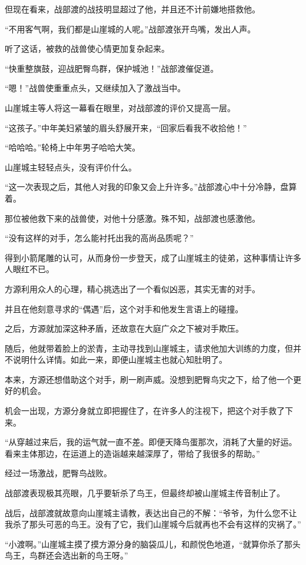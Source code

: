 \begin{this_body}
但现在看来，战部渡的战技明显超过了他，并且还不计前嫌地搭救他。

“不用客气啊，我们都是山崖城的人呢。”战部渡张开鸟嘴，发出人声。

听了这话，被救的战兽使心情更加复杂起来。

“快重整旗鼓，迎战肥臀鸟群，保护城池！”战部渡催促道。

“嗯！”战兽使重重点头，又继续加入了激战当中。

山崖城主等人将这一幕看在眼里，对战部渡的评价又提高一层。

“这孩子。”中年美妇紧皱的眉头舒展开来，“回家后看我不收拾他！”

“哈哈哈。”轮椅上中年男子哈哈大笑。

山崖城主轻轻点头，没有评价什么。

“这一次表现之后，其他人对我的印象又会上升许多。”战部渡心中十分冷静，盘算着。

那位被他救下来的战兽使，对他十分感激。殊不知，战部渡也感激他。

“没有这样的对手，怎么能衬托出我的高尚品质呢？”

得到小箭尾雕的认可，从而身份一步登天，成了山崖城主的徒弟，这种事情让许多人眼红不已。

方源利用众人的心理，精心挑选出了一个看似凶恶，其实无害的对手。

并且在他刻意寻求的“偶遇”后，这个对手和他发生言语上的碰撞。

之后，方源就加深这种矛盾，还故意在大庭广众之下被对手欺压。

随后，他就带着脸上的淤青，主动寻找到山崖城主，请求他加大训练的力度，但并不说明什么详情。如此一来，即便山崖城主也就心知肚明了。

本来，方源还想借助这个对手，刷一刷声威。没想到肥臀鸟灾之下，给了他一个更好的机会。

机会一出现，方源分身就立即把握住了，在许多人的注视下，把这个对手救了下来。

“从穿越过来后，我的运气就一直不差。即便天降鸟蛋那次，消耗了大量的好运。看来主体那边，在运道上的造诣越来越深厚了，带给了我很多的帮助。”

经过一场激战，肥臀鸟战败。

战部渡表现极其亮眼，几乎要斩杀了鸟王，但最终却被山崖城主传音制止了。

战后，战部渡就故意向山崖城主请教，表达出自己的不解：“爷爷，为什么您不让我杀了那头可恶的鸟王。没有了它，我们山崖城今后就再也不会有这样的灾祸了。”

“小渡啊。”山崖城主摸了摸方源分身的脑袋瓜儿，和颜悦色地道，“就算你杀了那头鸟王，鸟群还会选出新的鸟王呀。”


\end{this_body}
